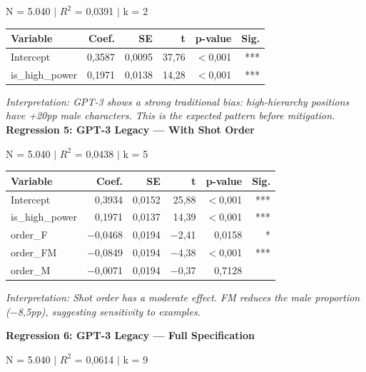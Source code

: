 \documentclass[jair,11pt,letterpaper]{article}
\begin{document}
\noindent N = 5.040 $|$ $R^2$ = 0,0391 $|$ k = 2

\begin{table}[H]
\centering
\begin{tabular}{lrrrrr}
\toprule
\textbf{Variable} & \textbf{Coef.} & \textbf{SE} & \textbf{t} & \textbf{p-value} & \textbf{Sig.} \\
\midrule
Intercept & 0,3587 & 0,0095 & 37,76 & $<$0,001 & *** \\
is\_high\_power & 0,1971 & 0,0138 & 14,28 & $<$0,001 & *** \\
\bottomrule
\end{tabular}
\end{table}

\noindent\textit{Interpretation: GPT-3 shows a strong traditional bias: high-hierarchy
positions have +20pp male characters. This is the expected pattern
before mitigation.}
\vspace{0.5cm}
\noindent\textbf{Regression 5: GPT-3 Legacy --- With Shot Order}

\noindent N = 5.040 $|$ $R^2$ = 0,0438 $|$ k = 5

\begin{table}[H]
\centering
\begin{tabular}{lrrrrr}
\toprule
\textbf{Variable} & \textbf{Coef.} & \textbf{SE} & \textbf{t} & \textbf{p-value} & \textbf{Sig.} \\
\midrule
Intercept & 0,3934 & 0,0152 & 25,88 & $<$0,001 & *** \\
is\_high\_power & 0,1971 & 0,0137 & 14,39 & $<$0,001 & *** \\
order\_F & $-$0,0468 & 0,0194 & $-$2,41 & 0,0158 & * \\
order\_FM & $-$0,0849 & 0,0194 & $-$4,38 & $<$0,001 & *** \\
order\_M & $-$0,0071 & 0,0194 & $-$0,37 & 0,7128 & \\
\bottomrule
\end{tabular}
\end{table}

\noindent\textit{Interpretation: Shot order has a moderate effect. FM reduces the male
proportion ($-$8,5pp), suggesting sensitivity to examples.}

\vspace{0.5cm}
\noindent\textbf{Regression 6: GPT-3 Legacy --- Full Specification}

\noindent N = 5.040 $|$ $R^2$ = 0,0614 $|$ k = 9
\end{document}
